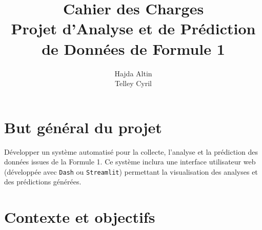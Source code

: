 \documentclass[11pt, a4paper]{article}
\title{
    \textbf{Cahier des Charges} \\
    \vspace{0.5cm}
    \Large Projet d'Analyse et de Prédiction de Données de Formule 1
}
\author{Hajda Altin \\ Telley Cyril}
\date{\currentReportDate}
\newcommand{\lib}[1]{\texttt{#1}}
\begin{document}
\begin{titlepage}
    \maketitle
    \vfill
    \thispagestyle{empty}
\end{titlepage}

\newpage
\tableofcontents
\thispagestyle{empty}
\newpage

\setcounter{page}{1}

\section{But général du projet}
Développer un système automatisé pour la collecte, l'analyse et la prédiction des données issues de la Formule 1. Ce système inclura une interface utilisateur web (développée avec \lib{Dash} ou \lib{Streamlit}) permettant la visualisation des analyses et des prédictions générées.

\section{Contexte et objectifs}
\end{document}
